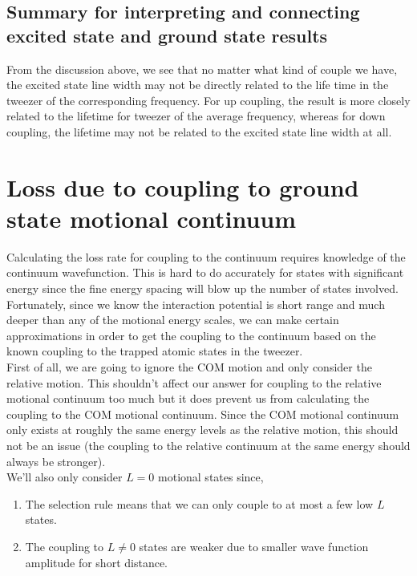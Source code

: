 \documentclass[10pt,fleqn]{article}
\begin{document}
\subsection{Summary for interpreting and connecting excited state and ground state results}

From the discussion above, we see that no matter what kind of couple we have,
the excited state line width may not be directly related to the life time in the tweezer
of the corresponding frequency. For up coupling, the result is more closely related
to the lifetime for tweezer of the average frequency, whereas for down coupling,
the lifetime may not be related to the excited state line width at all.

\section{Loss due to coupling to ground state motional continuum}

Calculating the loss rate for coupling to the continuum requires knowledge of the
continuum wavefunction. This is hard to do accurately for states with significant
energy since the fine energy spacing will blow up the number of states involved.
Fortunately, since we know the interaction potential is short range and much deeper
than any of the motional energy scales, we can make certain approximations in order
to get the coupling to the continuum based on the known coupling to the trapped atomic
states in the tweezer.\\

First of all, we are going to ignore the COM motion and only consider the relative motion.
This shouldn't affect our answer for coupling to the relative motional continuum too much
but it does prevent us from calculating the coupling to the COM motional continuum.
Since the COM motional continuum only exists at roughly the same energy levels as the
relative motion, this should not be an issue (the coupling to the relative continuum
at the same energy should always be stronger).\\

We'll also only consider $L=0$ motional states since,
\begin{enumerate}
\item The selection rule means that we can only couple to at most a few low $L$ states.
\item The coupling to $L\neq0$ states are weaker due to smaller wave function amplitude
  for short distance.
\end{enumerate}
\end{document}
